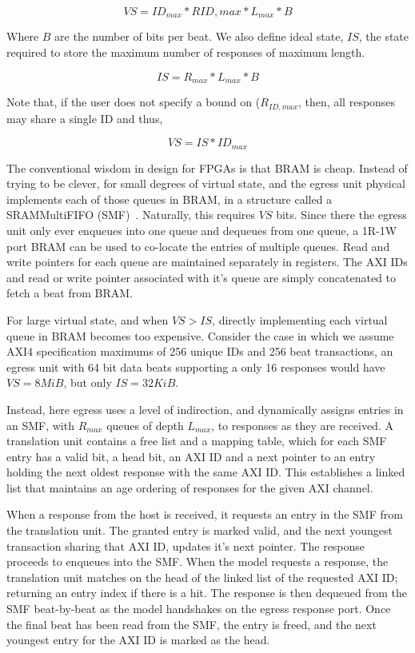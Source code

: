 $$VS = ID_{max}*R{ID,max}*L_{max}*B$$

Where $B$ are the number of bits per beat. We also define ideal state, $IS$,
the state required to store the maximum number of responses of maximum length.

$$IS = R_{max}*L_{max}*B$$

Note that, if the user does not specify a bound on ($R_{ID,max}$, then, all
responses may share a single ID and thus,

$$VS = IS*ID_{max}$$

The conventional wisdom in design for FPGAs is that BRAM is cheap. Instead of
trying to be clever, for small degrees of virtual state, and the egress unit
physical implements each of those queues in BRAM, in a structure called a
SRAMMultiFIFO (SMF)~\cite{smf}. Naturally, this requires $VS$ bits. Since there the egress unit only ever enqueues
into one queue and dequeues from one queue, a 1R-1W port BRAM can be used to
co-locate the entries of multiple queues.  Read and write pointers for each
queue are maintained separately in registers. The AXI IDs and read or write
pointer associated with it's queue are simply concatenated to fetch a beat from
BRAM.

For large virtual state, and when $VS > IS$, directly implementing each virtual
queue in BRAM becomes too expensive. Consider the case in which we assume AXI4
specification maximums of 256 unique IDs and 256 beat transactions, an egress
unit with 64 bit data beats supporting a only 16 responses would have $VS =
8MiB$, but only $IS = 32 KiB$.

Instead, here egress uses a level of indirection, and dynamically assigns
entries in an SMF, with $R_{max}$ queues of depth $L_{max}$, to responses as
they are received. A translation unit contains a free list and a mapping table,
which for each SMF entry has a valid bit, a head bit, an AXI ID and a next
pointer to an entry holding the next oldest response with the same AXI ID. This
establishes a linked list that maintains an age ordering of responses for the
given AXI channel.

When a response from the host is received, it requests an entry in the SMF from
the translation unit. The granted entry is marked valid, and the next youngest
transaction sharing that AXI ID, updates it's next pointer.  The response
proceeds to enqueues into the SMF. When the model requests a response, the
translation unit matches on the head of the linked list of the requested AXI
ID; returning an entry index if there is a hit. The response is then dequeued
from the SMF beat-by-beat as the model handshakes on the egress response port.
Once the final beat has been read from the SMF, the entry is freed, and the
next youngest entry for the AXI ID is marked as the head.

